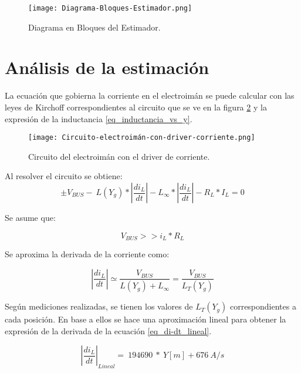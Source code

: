 \begin{figure}[H]
	\centering
	\texttt{[image: Diagrama-Bloques-Estimador.png]}
	\caption{Diagrama en Bloques del Estimador.}
	\label{fig:img_Diagrama-Bloques-Estimador.png}
\end{figure}

\section{An\'{a}lisis de la estimaci\'{o}n}

\noindent La ecuaci\'{o}n que gobierna la corriente en el electroim\'{a}n se puede calcular con las leyes de Kirchoff correspondientes al circuito que se ve en la figura \ref{fig:img_Circuito-electroimán-con-driver-corriente.png} y la expresión de la inductancia \ref{eq_inductancia_vs_y}.

\begin{figure}[H]
	\centering
	\texttt{[image: Circuito-electroimán-con-driver-corriente.png]}
	\caption{Circuito del electroimán con el driver de corriente.}
	\label{fig:img_Circuito-electroimán-con-driver-corriente.png}
\end{figure} 

\noindent Al resolver el circuito se obtiene:
\begin{equation} \label{eq_VbusCondicion}
	\pm V_{BUS}-\ L(Y_g)*\left|\frac{{di}_L}{dt}\right|-L_{\infty }*\left|\frac{{di}_L}{dt}\right|-R_L*I_L=0
\end{equation}


\noindent Se asume que:

\begin{equation} \label{eq_Derivadadi-dt}
	V_{BUS}>>i_L*R_L
\end{equation}
 
\noindent Se aproxima la derivada de la corriente como:

\begin{equation} \label{eq_derivadaAproximacion}
	\left|\frac{{di}_L}{dt}\right|\simeq \frac{V_{BUS}}{L(Y_g)+L_{\infty }}=\frac{V_{BUS}}{L_T(Y_g)}
\end{equation}

\noindent Seg\'{u}n mediciones realizadas, se tienen los valores de $L_T(Y_g)$ correspondientes a cada posici\'{o}n. En base a ellos se hace una aproximaci\'{o}n lineal para obtener la expresi\'{o}n de la derivada de la ecuaci\'{o}n \ref{eq_di-dt_lineal}.

\noindent 

\begin{equation} \label{eq_di-dt_lineal}
{\left|\frac{{di}_L}{dt}\right|}_{Lineal}=\ 194690\ *\ Y[m]+676\ A/s
\end{equation}

